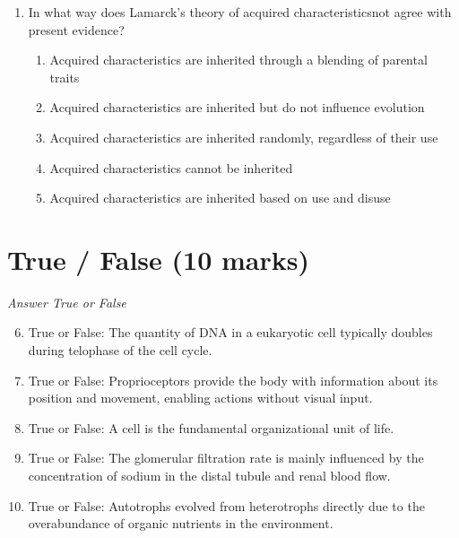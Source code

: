 \documentclass[12pt]{article}
\begin{document}
\begin{enumerate}[label=\arabic*.]
\begin{enumerate}[label=(\alph*)]
    \item Temperature, humidity, and air currents
    \item Plant species, root depth, and wind speed
    \item Soil fertility, irrigation methods, and cloud cover
    \item Water salinity, leaf color, and time of day
    \item Leaf surface area, stem length, and moon phase
\end{enumerate}
\item In what way does Lamarck's theory of acquired characteristicsnot agree with present evidence?
\begin{enumerate}[label=(\alph*)]
    \item Acquired characteristics are inherited through a blending of parental traits
    \item Acquired characteristics are inherited but do not influence evolution
    \item Acquired characteristics are inherited randomly, regardless of their use
    \item Acquired characteristics cannot be inherited
    \item Acquired characteristics are inherited based on use and disuse
\end{enumerate}
\end{enumerate}

\section*{True / False (10 marks)}
\textit{Answer True or False}
\begin{enumerate}[label=\arabic*.]
\setcounter{enumi}{5}
\item True or False: The quantity of DNA in a eukaryotic cell typically doubles during telophase of the cell cycle.
\item True or False: Proprioceptors provide the body with information about its position and movement, enabling actions without visual input.
\item True or False: A cell is the fundamental organizational unit of life.
\item True or False: The glomerular filtration rate is mainly influenced by the concentration of sodium in the distal tubule and renal blood flow.
\item True or False: Autotrophs evolved from heterotrophs directly due to the overabundance of organic nutrients in the environment.
\end{enumerate}
\end{document}
